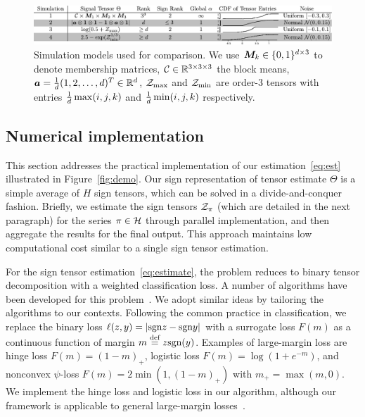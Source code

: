 \documentclass{article}
\theoremstyle{plain}
\theoremstyle{definition}
\def\sign{\textup{sgn}}
\begin{document}
\begin{figure}[h!]
\includegraphics[width=1\textwidth]{figure/simulation_new.pdf}
\vspace{-.8cm}
\caption{Simulation models used for comparison. We use $\bm M_k\in\{0,1\}^{d\times 3}$ to denote membership matrices, $\mathcal{C}\in\mathbb{R}^{3\times 3\times 3}$ the block means, $\bm{a}={1\over d}(1,2,\ldots,d)^T \in\mathbb{R}^d$, $\mathcal{Z}_{\max}$ and $\mathcal{Z}_{\min}$ are order-3 tensors with entries ${1\over d}\max(i,j,k)$ and ${1\over d}\min(i,j,k)$ respectively.}\label{tab:simulation}
\vspace{-.4cm}
\end{figure}


\subsection{Numerical implementation}
This section addresses the practical implementation of our estimation~\eqref{eq:est} illustrated in Figure~\ref{fig:demo}. Our sign representation of tensor estimate $\Theta$ is a simple average of $H$ sign tensors, which can be solved in a divide-and-conquer fashion. Briefly, we estimate the sign tensors $\mathcal{Z}_\pi$ (which are detailed in the next paragraph) for the series $\pi \in \mathcal{H}$ through parallel implementation, and then aggregate the results for the final output. This approach maintains low computational cost similar to a single sign tensor estimation.  


For the sign tensor estimation~\eqref{eq:estimate}, the problem reduces to binary tensor decomposition with a weighted classification loss. A number of algorithms have been developed for this problem~\cite{ghadermarzy2018learning,wang2018learning,hong2020generalized}. We adopt similar ideas by tailoring the algorithms to our contexts. Following the common practice in classification, we replace the binary loss $\ell(z,y)=|\sign z - \sign y|$ with a surrogate loss $F(m)$ as a continuous function of margin $m\stackrel{\text{def}}{=}z\sign(y)$. Examples of large-margin loss are hinge loss $F(m) = (1-m)_+$, logistic loss $F(m) =\log(1+e^{-m})$, and nonconvex $\psi$-loss $F(m)=2\min(1,(1-m)_+)$ with $m_{+}=\max(m,0)$. We implement the hinge loss and logistic loss in our algorithm, although our framework is applicable to general large-margin losses~\citep{bartlett2006convexity}. 
\end{document}
